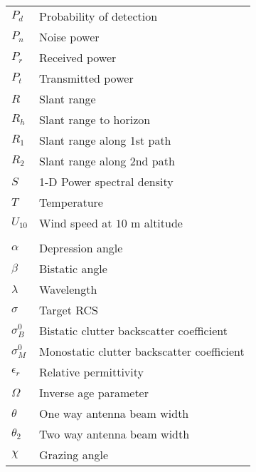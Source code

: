 \begin{supertabular}{ll}
$P_d$ & Probability of detection \\
$P_n$ & Noise power\\
$P_r$ & Received power \\
$P_t$ & Transmitted power \\
$R$ & Slant range \\
$R_h$ & Slant range to horizon \\
$R_1$ & Slant range along 1st path \\
$R_2$ & Slant range along 2nd path \\
$S$ & 1-D Power spectral density \\
$T$ & Temperature \\
$U_{10}$ & Wind speed at $10$ m altitude \\
\\
$\alpha$ & Depression angle \\
$\beta$ & Bistatic angle \\
$\lambda$ & Wavelength \\
$\sigma$ & Target RCS\\
$\sigma_B^0$ & Bistatic clutter backscatter coefficient \\
$\sigma_M^0$ & Monostatic clutter backscatter coefficient \\
$\epsilon_r$ & Relative permittivity \\
$\Omega$ & Inverse age parameter \\
$\theta$ & One way antenna beam width \\
$\theta_2$ & Two way antenna beam width \\
$\chi$ & Grazing angle \\
\end{supertabular}
